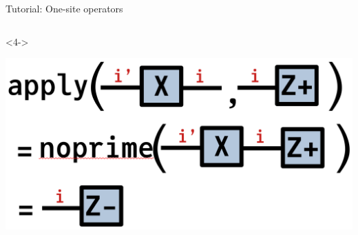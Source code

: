 \begin{frame}[fragile]{Tutorial: One-site operators}
\begin{columns}
\begin{column}{4.5cm}
\begin{onlyenv}<4->
\vspace*{0.0cm}
\begin{center}
\includegraphics[width=1.0\textwidth]{
  slides/assets/apply_XZp.png
}
\end{center}
\vspace*{0.0cm}
\end{onlyenv}

\end{column}

\end{columns}

\end{frame}
